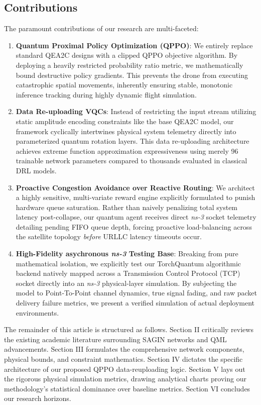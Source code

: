 \documentclass[conference]{IEEEtran}
\begin{document}
\subsection{Contributions}
The paramount contributions of our research are multi-faceted:
\begin{enumerate}
    \item \textbf{Quantum Proximal Policy Optimization (QPPO)}: We entirely replace standard QEA2C designs \cite{sasinda2025} with a clipped QPPO objective algorithm. By deploying a heavily restricted probability ratio metric, we mathematically bound destructive policy gradients. This prevents the drone from executing catastrophic spatial movements, inherently ensuring stable, monotonic inference tracking during highly dynamic flight simulation.
    \item \textbf{Data Re-uploading VQCs}: Instead of restricting the input stream utilizing static amplitude encoding constraints like the base QEA2C model, our framework cyclically intertwines physical system telemetry directly into parameterized quantum rotation layers. This data re-uploading architecture achieves extreme function approximation expressiveness using merely 96 trainable network parameters compared to thousands evaluated in classical DRL models.
    \item \textbf{Proactive Congestion Avoidance over Reactive Routing}: We architect a highly sensitive, multi-variate reward engine explicitly formulated to punish hardware queue saturation. Rather than naively penalizing total system latency post-collapse, our quantum agent receives direct \textit{ns-3} socket telemetry detailing pending FIFO queue depth, forcing proactive load-balancing across the satellite topology \textit{before} URLLC latency timeouts occur.
    \item \textbf{High-Fidelity asychronous \textit{ns-3} Testing Base}: Breaking from pure mathematical isolation, we explicitly test our TorchQuantum algorithmic backend natively mapped across a Transmission Control Protocol (TCP) socket directly into an \textit{ns-3} physical-layer simulation. By subjecting the model to Point-To-Point channel dynamics, true signal fading, and raw packet delivery failure metrics, we present a verified simulation of actual deployment environments.
\end{enumerate}

The remainder of this article is structured as follows. Section II critically reviews the existing academic literature surrounding SAGIN networks and QML advancements. Section III formulates the comprehensive network components, physical bounds, and constraint mathematics. Section IV dictates the specific architecture of our proposed QPPO data-reuploading logic. Section V lays out the rigorous physical simulation metrics, drawing analytical charts proving our methodology's statistical dominance over baseline metrics. Section VI concludes our research horizons.
\end{document}
